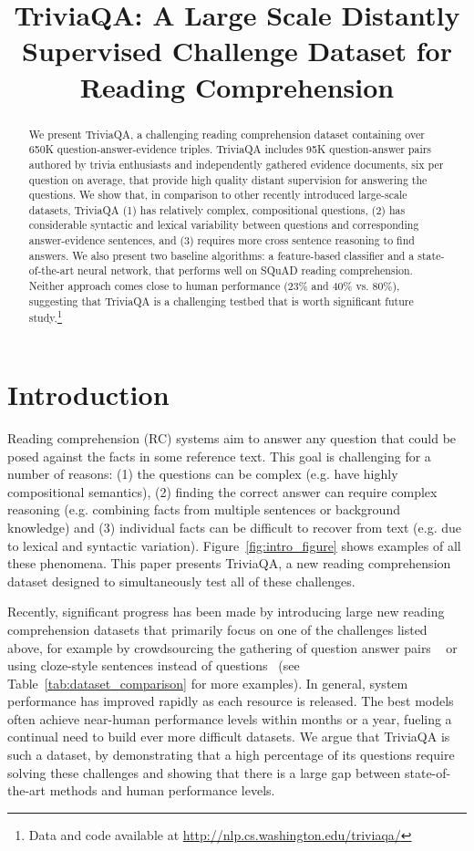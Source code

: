 \title{TriviaQA: A Large Scale Distantly Supervised Challenge Dataset for Reading Comprehension}

\begin{abstract}
We present TriviaQA, a challenging reading comprehension dataset containing over 650K question-answer-evidence triples. TriviaQA includes 95K question-answer pairs authored by trivia enthusiasts and independently gathered evidence documents, six per question on average, that provide high quality distant supervision for answering the questions. We show that, in comparison to other recently introduced large-scale datasets, TriviaQA (1) has relatively complex,  compositional questions, (2)  has considerable syntactic and lexical variability between questions and corresponding answer-evidence sentences, and (3) requires more cross sentence reasoning to find answers. We also present two baseline algorithms: a feature-based classifier and a state-of-the-art neural network, that performs well on SQuAD reading comprehension. Neither approach comes close to human performance (23\% and 40\% vs. 80\%),  suggesting that TriviaQA is a challenging testbed that is worth significant future study.\footnote{Data and code available at \url{http://nlp.cs.washington.edu/triviaqa/}}
\end{abstract}

\section{Introduction}

Reading comprehension (RC) systems aim to answer any question that could be posed against the facts in some reference text.  This goal is challenging for a number of reasons: (1) the questions can be complex (e.g. have highly compositional semantics), (2) finding the correct answer can require complex reasoning (e.g. combining facts from multiple sentences or  background knowledge) and (3) individual facts can be difficult to recover from text (e.g. due to lexical and syntactic variation). Figure~\ref{fig:intro_figure} shows examples of all these phenomena. This paper presents TriviaQA, a  new reading comprehension dataset  designed to simultaneously test all of these challenges.

Recently, significant progress has been made by introducing large new reading comprehension datasets that primarily focus on one of the challenges listed above, for example by crowdsourcing the gathering of question answer pairs ~\cite{Rajpurkar:16} or using cloze-style sentences instead of questions~\cite{Hermann:15, Onishi:16} (see Table~\ref{tab:dataset_comparison} for more examples). In general, system performance has improved rapidly as each resource is released. The best models often achieve near-human performance levels within months or a year, fueling a continual need to build ever more difficult datasets. We argue that TriviaQA is such a dataset, by demonstrating that a high percentage of  its questions require solving these challenges and showing that there is a large gap between state-of-the-art methods and human performance levels. 

